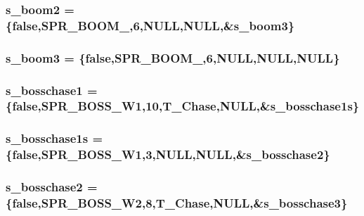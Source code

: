 \label{WL__ACT2_8C_a2a21a352d91ec680c37549be54df1e45}
\hypertarget{WL__ACT2_8C_a4b62a61a47a79b9290d9ed071767a114}{
\subsubsection[{s\_\-boom2}]{ {\bf s\_\-boom2} = \{false,SPR\_\-BOOM\_,6,NULL,NULL,\&{\bf s\_\-boom3}\}}}
\label{WL__ACT2_8C_a4b62a61a47a79b9290d9ed071767a114}
\hypertarget{WL__ACT2_8C_ab9fc861cc2aa3e8ad7c565874cc9cdda}{
\subsubsection[{s\_\-boom3}]{ {\bf s\_\-boom3} = \{false,SPR\_\-BOOM\_,6,NULL,NULL,NULL\}}}
\label{WL__ACT2_8C_ab9fc861cc2aa3e8ad7c565874cc9cdda}
\hypertarget{WL__ACT2_8C_a5135f3395ae6c6efc57951117610a58f}{
\subsubsection[{s\_\-bosschase1}]{ {\bf s\_\-bosschase1} = \{false,SPR\_\-BOSS\_\-W1,10,T\_\-Chase,NULL,\&{\bf s\_\-bosschase1s}\}}}
\label{WL__ACT2_8C_a5135f3395ae6c6efc57951117610a58f}
\hypertarget{WL__ACT2_8C_ac6a3ef80511e594150afa045afd3b9b7}{
\subsubsection[{s\_\-bosschase1s}]{ {\bf s\_\-bosschase1s} = \{false,SPR\_\-BOSS\_\-W1,3,NULL,NULL,\&{\bf s\_\-bosschase2}\}}}
\label{WL__ACT2_8C_ac6a3ef80511e594150afa045afd3b9b7}
\hypertarget{WL__ACT2_8C_ab62cb1d2594a942a726daa00a0d06bd8}{
\subsubsection[{s\_\-bosschase2}]{ {\bf s\_\-bosschase2} = \{false,SPR\_\-BOSS\_\-W2,8,T\_\-Chase,NULL,\&{\bf s\_\-bosschase3}\}}}

